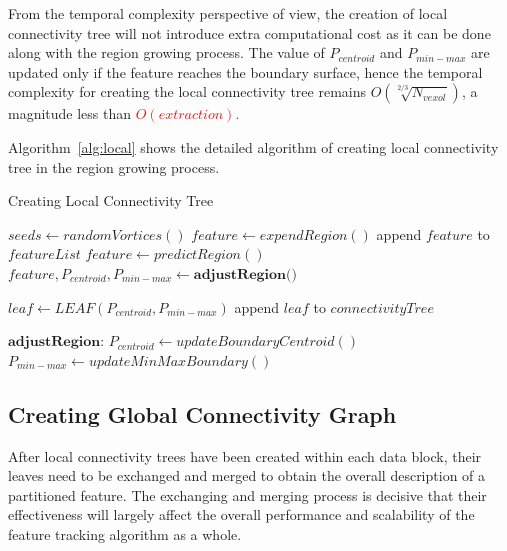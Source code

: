 \documentclass[10pt, conference, compsocconf]{IEEEtran}
\begin{document}
From the temporal complexity perspective of view, the creation of local connectivity tree will not introduce extra computational cost as it can be done along with the region growing process. The value of $P_{centroid}$ and $P_{min-max}$ are updated only if the feature reaches the boundary surface, hence the temporal complexity for creating the local connectivity tree remains ${O(\sqrt[2/3]{N_{vexol}})}$, a magnitude less than \textcolor{red}{$O(extraction)$.}

Algorithm~\ref{alg:local} shows the detailed algorithm of creating local connectivity tree in the region growing process.
\begin{algorithm}
\caption{Creating Local Connectivity Tree}
\label{alg:local}

\begin{algorithmic}
		\STATE $seeds \leftarrow randomVortices()$
			\STATE $feature \leftarrow expendRegion()$
			\STATE append $feature$ to $featureList$
		\ENDFOR	
	\ELSE
			\STATE $feature \leftarrow predictRegion()$
			\STATE $feature,P_{centroid},P_{min-max} \leftarrow \textbf{adjustRegion()}$
			
			\STATE $leaf \leftarrow LEAF(P_{centroid}, P_{min-max})$
			\STATE append $leaf$ to $connectivityTree$
		\ENDFOR
	\ENDIF
\end{algorithmic}

\begin{algorithmic} \STATE \end{algorithmic}	%

\begin{algorithmic}
\STATE $\textbf{adjustRegion:}$
		\STATE $P_{centroid} \leftarrow updateBoundaryCentroid()$
		\STATE $P_{min-max} \leftarrow updateMinMaxBoundary()$
	\ENDIF
\end{algorithmic}
\end{algorithm}

\subsection{Creating Global Connectivity Graph}

After local connectivity trees have been created within each data block, their leaves need to be exchanged and merged to obtain the overall description of a partitioned feature. The exchanging and merging process is decisive that their effectiveness will largely affect the overall performance and scalability of the feature tracking algorithm as a whole.
\end{document}
